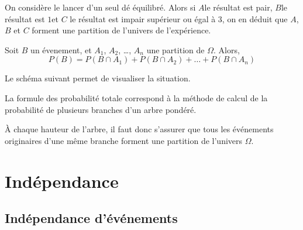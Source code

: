 \documentclass{poly}
\begin{document}
\begin{example}
On considère le lancer d'un seul dé équilibré. Alors si $A$\og le résultat est pair\fg, $B$\og le résultat est $1$\fg et $C$ \og le résultat est impair supérieur ou égal à $3$\fg, on en déduit que $A$, $B$ et $C$ forment une partition de l'univers de l'expérience.
\end{example}

\begin{proposition}
Soit $B$ un évenement, et $A_1$, $A_2$, \dots, $A_n$ une partition de $\Omega$. Alors,
\begin{equation*}
P(B) = P(B \cap A_1) + P(B \cap A_2) + \dots + P(B \cap A_n)
\end{equation*}
\end{proposition}

\begin{remark}
Le schéma suivant permet de visualiser la situation.
\begin{center}
\end{center}
\end{remark}

\begin{remark}
La formule des probabilité totale correspond à la méthode de calcul de la probabilité de plusieurs branches d'un arbre pondéré.

À chaque hauteur de l'arbre, il faut donc s'assurer que tous les événements originaires d'une même branche forment une partition de l'univers $\Omega$. 
\end{remark}

\newpage

\section{Indépendance}
\subsection{Indépendance d'événements}
\end{document}

